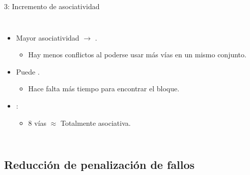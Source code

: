 \begin{frame}[t]{3: Incremento de asociatividad}
\begin{columns}[T]


\begin{itemize}
  \item Mayor asociatividad $\rightarrow$ .
    \begin{itemize}
      \item Hay menos conflictos al poderse usar más vías en un mismo conjunto.
    \end{itemize}

  \item Puede .
    \begin{itemize}
      \item Hace falta más tiempo para encontrar el bloque.
    \end{itemize}

  \item {}:
    \begin{itemize}
      \item 8 vías $\approx$ Totalmente asociativa.
    \end{itemize}
\end{itemize}


\end{columns}
\end{frame}

\subsection{Reducción de penalización de fallos}

